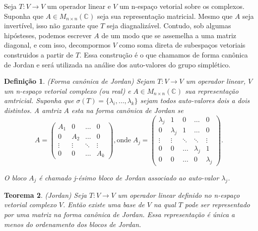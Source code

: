 \documentclass[12pt]{book}
\newtheorem{teorema}{Teorema}[section]
\newtheorem{definicao}[teorema]{Definição}
\newcommand{\complexo}[1]{\mathbb{C}^{#1}}
\newcommand{\matrizquadcomplexa}[1]{M_{#1 \times #1}(\complexo{})}
\begin{document}
	Seja $T:V\to V$ um operador linear e $V$ um n-espaço vetorial sobre os complexos. Suponha que $A \in \matrizquadcomplexa{n}$ seja sua representação matricial. Mesmo que $A$ seja invertível, isso não garante que $T$ seja diagnalizável. Contudo, sob algumas hipósteses, podemos escrever $A$ de um modo que se assemelha a uma matriz diagonal, e com isso, decompormos $V$ como soma direta de subespaços vetoriais construidos a partir de $T$. Essa construção é o que chamamos de forma canônica de Jordan e será utilizada na análise dos auto-valores do grupo simplético.
	
	\begin{definicao}
		(Forma canônica de Jordan) Sejam $T:V \to V$ um operador linear, $V$ um n-espaço vetorial complexo (ou real) e $A\in \matrizquadcomplexa{n}$ sua representação amtricial. Suponha que $\sigma(T) = \{\lambda_{i},\dots, \lambda_{k} \}$ sejam todos auto-valores dois a dois distintos. A amtriz $A$ esta na forma canônica de Jordan se
		$$
		A = 
		\left(
		\begin{array}{cccc}
		A_{1} & 0 & \hdots & 0
		\\
		0 & A_{2} & \hdots & 0
		\\
		\vdots & \vdots & \ddots & \vdots
		\\
		0 & 0 & \hdots & A_{k}
		\end{array}
		\right), \text{onde}\;
		A_{j} =
		\left(
		\begin{array}{ccccc}
		\lambda_{j} & 1 & 0 & \hdots & 0
		\\
		0 & \lambda_{j} & 1 & \hdots & 0
		\\
		\vdots & \vdots & \ddots & \ddots & \vdots
		\\
		0 & 0  & \hdots & \lambda_{j} & 1
		\\
		0 & 0 & \hdots & 0 & \lambda_{j}
		\end{array}
		\right).
		$$
		
		O bloco $A_{j}$ é chamado j-ésimo bloco de Jordan associado ao auto-valor $\lambda_{j}$.
		
	\end{definicao}
	
	\begin{teorema}\label{teorema_jordan}
		(Jordan) Seja $T:V\to V$ um operador linear definido no n-espaço vetorial complexo $V$. Então existe uma base de $V$ na qual $T$ pode ser representado por uma matriz na forma canônica de Jordan. Essa representação é única a menos do ordenamento dos blocos de Jordan.
	\end{teorema}
	
\end{document}
